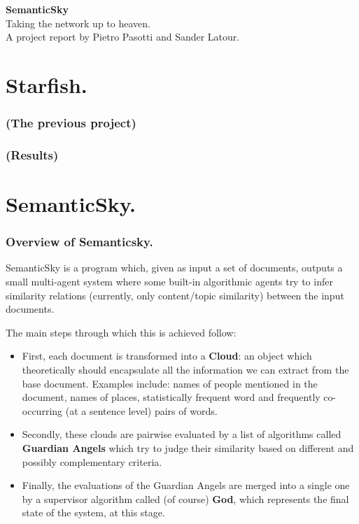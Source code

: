 \documentclass[11pt]{article}
\begin{document}
\begin{center}
\Huge{\textbf{SemanticSky}} \\ \large{Taking the network up to heaven.} \\\vspace{15pt} A project report by Pietro Pasotti and Sander Latour.
\end{center}

\tableofcontents
\clearpage

\part{Starfish.}

\section{(The previous project)}

\section{(Results)}



\part{SemanticSky.}

\section{Overview of Semanticsky.}

SemanticSky is a program which, given as input a set of documents, outputs a small multi-agent system where some built-in algorithmic agents try to infer similarity relations (currently, only content/topic similarity) between the input documents.

The main steps through which this is achieved follow:

\begin{itemize}
\item First, each document is transformed into a {\bf Cloud}: an object which theoretically should encapsulate all the information we can extract from the base document. Examples include: names of people mentioned in the document, names of places, statistically frequent word and frequently co-occurring (at a sentence level) pairs of words.
\item  Secondly, these clouds are pairwise evaluated by a list of algorithms called {\bf Guardian Angels} which try to judge their similarity based on different and possibly complementary criteria.
\item Finally, the evaluations of the Guardian Angels are merged into a single one by a supervisor algorithm called (of course) \textbf{God}, which represents the final state of the system, at this stage.
\end{itemize}
\end{document}
